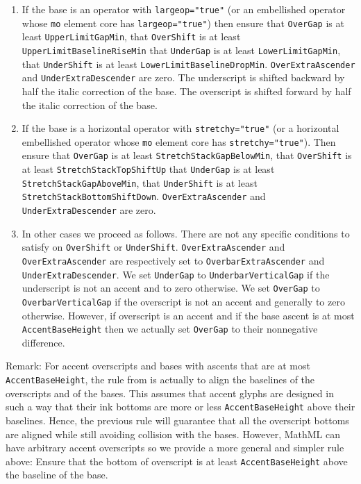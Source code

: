 \begin{enumerate}
\item If the base is an operator with {\tt largeop="true"}
  (or an embellished operator whose {\tt mo} element core has
  {\tt largeop="true"}) then ensure that {\tt OverGap} is at least
  {\tt UpperLimitGapMin}, that {\tt OverShift} is at least
  {\tt UpperLimitBaselineRiseMin} that {\tt UnderGap} is at
  least
  {\tt LowerLimitGapMin}, that {\tt UnderShift} is at least
  {\tt LowerLimitBaselineDropMin}.
  {\tt OverExtraAscender} and
  {\tt UnderExtraDescender} are zero. The
  underscript is shifted backward by half the italic correction of the base.
  The overscript is shifted forward by half the italic correction of the base.
\item If the base is a horizontal operator with {\tt stretchy="true"}
  (or a horizontal embellished operator whose {\tt mo} element core has
  {\tt stretchy="true"}). Then ensure that {\tt OverGap} is at least
  {\tt StretchStackGapBelowMin}, that {\tt OverShift} is at
  least
  {\tt StretchStackTopShiftUp} that {\tt UnderGap} is at least
  {\tt StretchStackGapAboveMin},
  that {\tt UnderShift} is at least
  {\tt StretchStackBottomShiftDown}.
  {\tt OverExtraAscender} and
  {\tt UnderExtraDescender} are zero.
\item In other cases we proceed as follows.
  There are not any specific conditions to satisfy on {\tt OverShift} or
  {\tt UnderShift}.
  {\tt OverExtraAscender} and
  {\tt OverExtraAscender} are respectively set to
  {\tt OverbarExtraAscender}
  and {\tt UnderExtraDescender}.
  We set {\tt UnderGap} to {\tt UnderbarVerticalGap}
  if the underscript is not an accent and to zero otherwise.
  We set {\tt OverGap} to {\tt OverbarVerticalGap}
  if the overscript is not an accent and generally to zero otherwise.
  However, if overscript is an accent and if the base ascent is at most
  {\tt AccentBaseHeight} then we actually set {\tt OverGap} to
  their nonnegative difference.
\end{enumerate}

Remark: For accent overscripts and bases with ascents that are at most
{\tt AccentBaseHeight}, the rule from
\cite{OpenFontFormat3} \cite{TeXBook} is actually to align the baselines of the
overscripts and of the bases. This assumes that accent glyphs are designed in
such a way that their ink bottoms are more or less
{\tt AccentBaseHeight} above their baselines. Hence, the
previous rule will guarantee that all the overscript bottoms are aligned while
still avoiding collision with the bases. However, MathML can have arbitrary
accent overscripts so we provide a more general and simpler rule above: Ensure
that the bottom of overscript is at least
{\tt AccentBaseHeight} above the baseline of the base.

